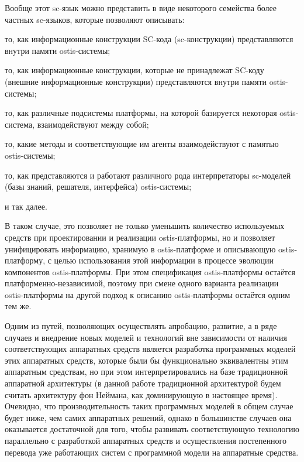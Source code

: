 Вообще этот sc-язык можно представить в виде некоторого семейства более частных sc-языков, которые позволяют описывать:
\begin{textitemize}
    \item то, как информационные конструкции SC-кода (sc-конструкции) представляются внутри памяти ostis-системы;
    \item то, как информационные конструкции, которые не принадлежат SC-коду (внешние информационные конструкции) представляются внутри памяти ostis-системы;
    \item то, как различные подсистемы платформы, на которой базируется некоторая ostis-система, взаимодействуют между собой;
    \item то, какие методы и соответствующие им агенты взаимодействуют с памятью ostis-системы;
    \item то, как представляются и работают различного рода интерпретаторы sc-моделей (базы знаний, решателя, интерфейса) ostis-системы;
    \item и так далее.
\end{textitemize}

В таком случае, это позволяет не только уменьшить количество используемых средств при проектировании и реализации ostis-платформы, но и позволяет унифицировать информацию, хранимую в ostis-платформе и описывающую ostis-платформу, с целью использования этой информации в процессе эволюции компонентов ostis-платформы. При этом спецификация ostis-платформы остаётся платформенно-независимой, поэтому при смене одного варианта реализации ostis-платформы на другой подход к описанию ostis-платформы остаётся одним тем же.

Одним из путей, позволяющих осуществлять апробацию, развитие, а в ряде случаев и внедрение новых моделей и технологий вне зависимости от наличия соответствующих аппаратных средств является разработка программных моделей этих аппаратных средств, которые были бы функционально эквивалентны этим аппаратным средствам, но при этом интерпретировались на базе традиционной аппаратной архитектуры (в данной работе традиционной архитектурой будем считать архитектуру фон Неймана, как доминирующую в настоящее время). Очевидно, что производительность таких программных моделей в общем случае будет ниже, чем самих аппаратных решений, однако в большинстве случаев она оказывается достаточной для того, чтобы развивать
соответствующую технологию параллельно с разработкой аппаратных средств и осуществления постепенного перевода уже работающих систем с программной модели на аппаратные средства.

